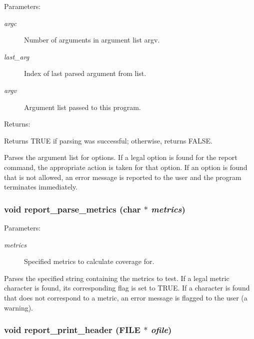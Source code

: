 \begin{Desc}
\item[Parameters: ]\par
\begin{description}
\item[{\em 
argc}]Number of arguments in argument list argv. \item[{\em 
last\_\-arg}]Index of last parsed argument from list. \item[{\em 
argv}]Argument list passed to this program.\end{description}
\end{Desc}
\begin{Desc}
\item[Returns: ]\par
Returns TRUE if parsing was successful; otherwise, returns FALSE.\end{Desc}
Parses the argument list for options. If a legal option is found for the report command, the appropriate action is taken for that option. If an option is found that is not allowed, an error message is reported to the user and the program terminates immediately. 
\subsubsection{\setlength{\rightskip}{0pt plus 5cm}void report\_\-parse\_\-metrics (char $\ast$ {\em metrics})}\label{report_8c_a11}


\begin{Desc}
\item[Parameters: ]\par
\begin{description}
\item[{\em 
metrics}]Specified metrics to calculate coverage for.\end{description}
\end{Desc}
Parses the specified string containing the metrics to test. If a legal metric character is found, its corresponding flag is set to TRUE. If a character is found that does not correspond to a metric, an error message is flagged to the user (a warning). 
\subsubsection{\setlength{\rightskip}{0pt plus 5cm}void report\_\-print\_\-header (FILE $\ast$ {\em ofile})}\label{report_8c_a15}


